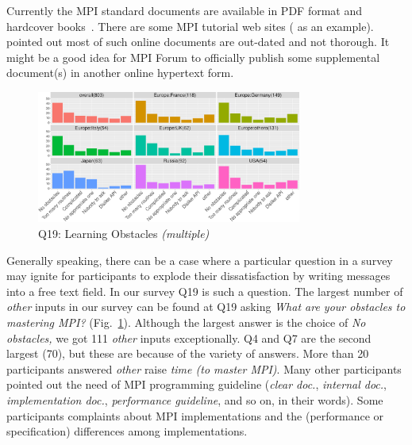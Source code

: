 \documentclass[preprint,5p,times]{elsarticle}
\def\myquote#1{{\it #1}}
\begin{document}
Currently the MPI standard documents are available in PDF format and
hardcover books~\cite{mpi-hardcover}. There are some MPI tutorial web
sites (\cite{mpi-tutorial} as an example). \cite{mpi-tutorial-intro}
pointed out most of such online documents are out-dated and not
thorough. It might be a good idea for MPI Forum to officially publish
some supplemental document(s) in another online hypertext form.

\begin{figure}[htb]
\begin{center}
\includegraphics[width=8.7cm]{R-scripts/Q19.pdf}
\caption{Q19: Learning Obstacles {\it(multiple)}}
\label{fig:learning-obstacles}
\end{center}
\end{figure}

Generally speaking, there can be a case where a particular question in
a survey may ignite for participants to explode their dissatisfaction
by writing messages into a free text field. In our survey Q19 is
such a question. The
largest number of \myquote{other} inputs in our survey can be found
at Q19 asking \myquote{What are your obstacles to mastering MPI?}
(Fig.~\ref{fig:learning-obstacles}). Although the largest answer is
the choice of \myquote{No obstacles,} we got 111 \myquote{other} inputs
exceptionally. Q4 and Q7 are the second largest (70), but these are
because of the variety of answers.
More than 20 participants answered \myquote{other} raise
\myquote{time (to master MPI)}. Many other participants pointed
out the need of MPI programming guideline (\myquote{clear doc.},
\myquote{internal doc.}, \myquote{implementation
  doc.}, \myquote{performance guideline}, and so on, in their words).
Some participants complaints about MPI implementations and the
(performance or specification) differences among implementations.
\end{document}
